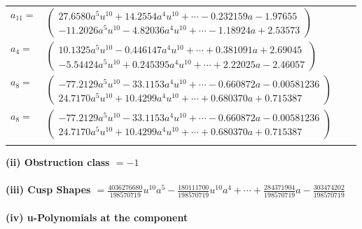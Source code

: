 \documentclass[1p]{elsarticle_modified}
\theoremstyle{definition}
\begin{document}
\begin{tabular}{m{7pt} m{180pt} m{7pt} m{180pt} }
\flushright $a_{11}=$&$\begin{pmatrix}27.6580 a^{5} u^{10}+14.2554 a^{4} u^{10}+\cdots-0.232159 a-1.97655\\-11.2026 a^{5} u^{10}-4.82036 a^{4} u^{10}+\cdots-1.18924 a+2.53573\end{pmatrix}$ \\
\flushright $a_{4}=$&$\begin{pmatrix}10.1325 a^{5} u^{10}-0.446147 a^{4} u^{10}+\cdots+0.381091 a+2.69045\\-5.54424 a^{5} u^{10}+0.245395 a^{4} u^{10}+\cdots+2.22025 a-2.46057\end{pmatrix}$ \\
\flushright $a_{8}=$&$\begin{pmatrix}-77.2129 a^{5} u^{10}-33.1153 a^{4} u^{10}+\cdots-0.660872 a-0.00581236\\24.7170 a^{5} u^{10}+10.4299 a^{4} u^{10}+\cdots+0.680370 a+0.715387\end{pmatrix}$\\ \flushright $a_{8}=$&$\begin{pmatrix}-77.2129 a^{5} u^{10}-33.1153 a^{4} u^{10}+\cdots-0.660872 a-0.00581236\\24.7170 a^{5} u^{10}+10.4299 a^{4} u^{10}+\cdots+0.680370 a+0.715387\end{pmatrix}$\\&\end{tabular}
\flushleft \textbf{(ii) Obstruction class $= -1$}\\~\\
\flushleft \textbf{(iii) Cusp Shapes $= \frac{4036276680}{198570719} u^{10} a^5-\frac{180111700}{198570719} u^{10} a^4+\cdots+\frac{284371904}{198570719} a-\frac{303474202}{198570719}$}\\~\\
\newpage\renewcommand{\arraystretch}{1}
\flushleft \textbf{(iv) u-Polynomials at the component}\newline \\
\end{document}
